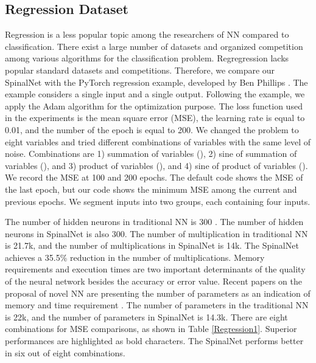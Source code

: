 \documentclass[journal]{IEEEtran}
\begin{document}
\subsection{Regression Dataset}
Regression is a less popular topic among the researchers of NN compared to classification. There exist a large number of datasets and organized competition among various algorithms for the classification problem. Regregression lacks popular standard datasets and competitions. Therefore, we compare our SpinalNet with the PyTorch regression example, developed by Ben Phillips \cite{Regression}. The example considers a single input and a single output. Following the example, we apply the Adam algorithm \cite{kingma2014adam} for the optimization purpose. The loss function used in the experiments is the mean square error (MSE), the learning rate is equal to 0.01, and the number of the epoch is equal to 200. We changed the problem to eight variables and tried different combinations of variables with the same level of noise. Combinations are 1) summation of variables (), 2) sine of summation of variables (), and 3) product of variables (), and 4) sine of product of variables ().  We record the MSE at 100 and 200 epochs. The default code \cite{Regression} shows the MSE of the last epoch, but our code shows the minimum MSE among the current and previous epochs. We segment inputs into two groups, each containing four inputs.  

The number of hidden neurons in traditional NN is 300 \cite{Regression}. The number of hidden neurons in SpinalNet is also 300. The number of multiplication in traditional NN is 21.7k, and the number of multiplications in SpinalNet is 14k. The SpinalNet achieves a 35.5\% reduction in the number of multiplications. Memory requirements and execution times are two important determinants of the quality of the neural network besides the accuracy or error value. Recent papers on the proposal of novel NN are presenting the number of parameters as an indication of memory and time requirement \cite{touvron2020fixing, du2020spinenet}. The number of parameters in the traditional NN is 22k, and the number of parameters in SpinalNet is 14.3k. 
There are eight combinations for MSE comparisons, as shown in Table \ref{Regression1}. Superior performances are highlighted as bold characters. The SpinalNet performs better in six out of eight combinations. 
 
\end{document}
